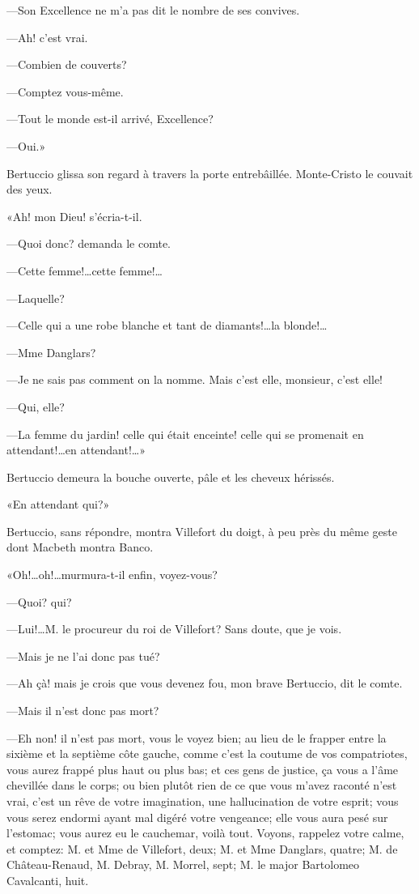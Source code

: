 —Son Excellence ne m'a pas dit le nombre de ses convives. 

—Ah! c'est vrai. 

—Combien de couverts? 

—Comptez vous-même. 

—Tout le monde est-il arrivé, Excellence? 

—Oui.» 

Bertuccio glissa son regard à travers la porte entrebâillée. Monte-Cristo le couvait des yeux. 

«Ah! mon Dieu! s'écria-t-il. 

—Quoi donc? demanda le comte. 

—Cette femme!\dots cette femme!\dots 

—Laquelle? 

—Celle qui a une robe blanche et tant de diamants!\dots la blonde!\dots 

—Mme Danglars? 

—Je ne sais pas comment on la nomme. Mais c'est elle, monsieur, c'est elle! 

—Qui, elle? 

—La femme du jardin! celle qui était enceinte! celle qui se promenait en attendant!\dots en attendant!\dots» 

Bertuccio demeura la bouche ouverte, pâle et les cheveux hérissés. 

«En attendant qui?» 

Bertuccio, sans répondre, montra Villefort du doigt, à peu près du même geste dont Macbeth montra Banco. 

«Oh!\dots oh!\dots murmura-t-il enfin, voyez-vous? 

—Quoi? qui? 

—Lui!\dots M. le procureur du roi de Villefort? Sans doute, que je vois. 

—Mais je ne l'ai donc pas tué? 

—Ah çà! mais je crois que vous devenez fou, mon brave Bertuccio, dit le comte. 

—Mais il n'est donc pas mort? 

—Eh non! il n'est pas mort, vous le voyez bien; au lieu de le frapper entre la sixième et la septième côte gauche, comme c'est la coutume de vos compatriotes, vous aurez frappé plus haut ou plus bas; et ces gens de justice, ça vous a l'âme chevillée dans le corps; ou bien plutôt rien de ce que vous m'avez raconté n'est vrai, c'est un rêve de votre imagination, une hallucination de votre esprit; vous vous serez endormi ayant mal digéré votre vengeance; elle vous aura pesé sur l'estomac; vous aurez eu le cauchemar, voilà tout. Voyons, rappelez votre calme, et comptez: M. et Mme de Villefort, deux; M. et Mme Danglars, quatre; M. de Château-Renaud, M. Debray, M. Morrel, sept; M. le major Bartolomeo Cavalcanti, huit. 

